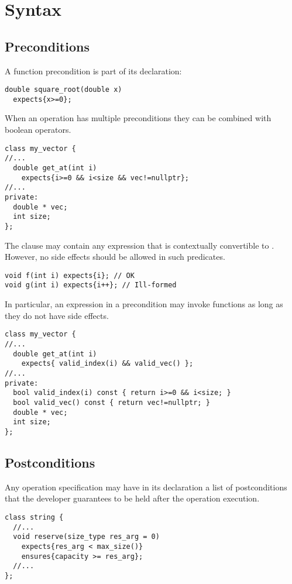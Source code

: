 \section{Syntax}

\subsection{Preconditions}

A function precondition is part of its declaration:

\begin{lstlisting}
double square_root(double x)
  expects{x>=0};
\end{lstlisting}

When an operation has multiple preconditions they can be combined with boolean operators.

\begin{lstlisting}
class my_vector {
//...
  double get_at(int i)
    expects{i>=0 && i<size && vec!=nullptr};
//...
private:
  double * vec;
  int size;
};
\end{lstlisting}

The  clause may contain any expression that is contextually
convertible to . However, no side effects should be allowed in such
predicates.

\begin{lstlisting}
void f(int i) expects{i}; // OK
void g(int i) expects{i++}; // Ill-formed
\end{lstlisting}

In particular, an expression in a precondition may invoke functions as long as
they do not have side effects.

\begin{lstlisting}
class my_vector {
//...
  double get_at(int i)
    expects{ valid_index(i) && valid_vec() };
//...
private:
  bool valid_index(i) const { return i>=0 && i<size; }
  bool valid_vec() const { return vec!=nullptr; }
  double * vec;
  int size;
};
\end{lstlisting}

\subsection{Postconditions}

Any operation specification may have in its declaration a list of
postconditions that the developer guarantees to be held after the operation
execution.

\begin{lstlisting}
class string {
  //...
  void reserve(size_type res_arg = 0)
    expects{res_arg < max_size()}
    ensures{capacity >= res_arg};
  //...
};
\end{lstlisting}

